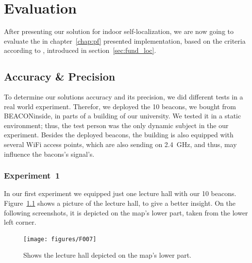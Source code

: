 \chapter{Evaluation} \label{chap:evaluation}
After presenting our solution for indoor self-localization, we are now going to evaluate the in chapter~\ref{chap:pf} presented implementation, based on the criteria according to \citet{IEEE:survey_wireless_indoor_pos}, introduced in section~\ref{sec:fund_loc}.

\section{Accuracy \& Precision}
To determine our solutions accuracy and its precision, we did different tests in a real world experiment. Therefor, we deployed the 10 beacons, we bought from BEACONinside, in parts of a building of our university. We tested it in a static environment; thus, the test person was the only dynamic subject in the our experiment. Besides the deployed beacons, the building is also equipped with several WiFi access points, which are also sending on 2.4~GHz, and thus, may influence the bacons's signal's.

\subsection*{Experiment~1}
In our first experiment we equipped just one lecture hall with our 10 beacons. Figure~\ref{fig:f007} shows a picture of the lecture hall, to give a better insight. On the following screenshots, it is depicted on the map's lower part, taken from the lower left corner.

\begin{figure}
	\texttt{[image: figures/F007]}
	\caption{Shows the lecture hall depicted on the map's lower part.}
	\label{fig:f007}
\end{figure}

